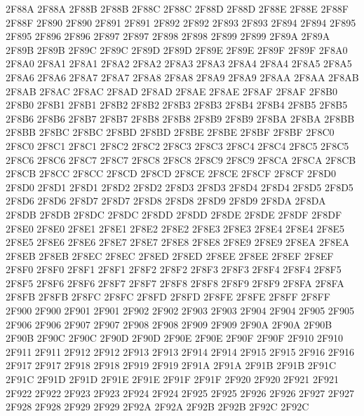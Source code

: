 \ID 2F88A 2F88A
\ID 2F88B 2F88B
\ID 2F88C 2F88C
\ID 2F88D 2F88D
\ID 2F88E 2F88E
\ID 2F88F 2F88F
\ID 2F890 2F890
\ID 2F891 2F891
\ID 2F892 2F892
\ID 2F893 2F893
\ID 2F894 2F894
\ID 2F895 2F895
\ID 2F896 2F896
\ID 2F897 2F897
\ID 2F898 2F898
\ID 2F899 2F899
\ID 2F89A 2F89A
\ID 2F89B 2F89B
\ID 2F89C 2F89C
\ID 2F89D 2F89D
\ID 2F89E 2F89E
\ID 2F89F 2F89F
\ID 2F8A0 2F8A0
\ID 2F8A1 2F8A1
\ID 2F8A2 2F8A2
\ID 2F8A3 2F8A3
\ID 2F8A4 2F8A4
\ID 2F8A5 2F8A5
\ID 2F8A6 2F8A6
\ID 2F8A7 2F8A7
\ID 2F8A8 2F8A8
\ID 2F8A9 2F8A9
\ID 2F8AA 2F8AA
\ID 2F8AB 2F8AB
\ID 2F8AC 2F8AC
\ID 2F8AD 2F8AD
\ID 2F8AE 2F8AE
\ID 2F8AF 2F8AF
\ID 2F8B0 2F8B0
\ID 2F8B1 2F8B1
\ID 2F8B2 2F8B2
\ID 2F8B3 2F8B3
\ID 2F8B4 2F8B4
\ID 2F8B5 2F8B5
\ID 2F8B6 2F8B6
\ID 2F8B7 2F8B7
\ID 2F8B8 2F8B8
\ID 2F8B9 2F8B9
\ID 2F8BA 2F8BA
\ID 2F8BB 2F8BB
\ID 2F8BC 2F8BC
\ID 2F8BD 2F8BD
\ID 2F8BE 2F8BE
\ID 2F8BF 2F8BF
\ID 2F8C0 2F8C0
\ID 2F8C1 2F8C1
\ID 2F8C2 2F8C2
\ID 2F8C3 2F8C3
\ID 2F8C4 2F8C4
\ID 2F8C5 2F8C5
\ID 2F8C6 2F8C6
\ID 2F8C7 2F8C7
\ID 2F8C8 2F8C8
\ID 2F8C9 2F8C9
\ID 2F8CA 2F8CA
\ID 2F8CB 2F8CB
\ID 2F8CC 2F8CC
\ID 2F8CD 2F8CD
\ID 2F8CE 2F8CE
\ID 2F8CF 2F8CF
\ID 2F8D0 2F8D0
\ID 2F8D1 2F8D1
\ID 2F8D2 2F8D2
\ID 2F8D3 2F8D3
\ID 2F8D4 2F8D4
\ID 2F8D5 2F8D5
\ID 2F8D6 2F8D6
\ID 2F8D7 2F8D7
\ID 2F8D8 2F8D8
\ID 2F8D9 2F8D9
\ID 2F8DA 2F8DA
\ID 2F8DB 2F8DB
\ID 2F8DC 2F8DC
\ID 2F8DD 2F8DD
\ID 2F8DE 2F8DE
\ID 2F8DF 2F8DF
\ID 2F8E0 2F8E0
\ID 2F8E1 2F8E1
\ID 2F8E2 2F8E2
\ID 2F8E3 2F8E3
\ID 2F8E4 2F8E4
\ID 2F8E5 2F8E5
\ID 2F8E6 2F8E6
\ID 2F8E7 2F8E7
\ID 2F8E8 2F8E8
\ID 2F8E9 2F8E9
\ID 2F8EA 2F8EA
\ID 2F8EB 2F8EB
\ID 2F8EC 2F8EC
\ID 2F8ED 2F8ED
\ID 2F8EE 2F8EE
\ID 2F8EF 2F8EF
\ID 2F8F0 2F8F0
\ID 2F8F1 2F8F1
\ID 2F8F2 2F8F2
\ID 2F8F3 2F8F3
\ID 2F8F4 2F8F4
\ID 2F8F5 2F8F5
\ID 2F8F6 2F8F6
\ID 2F8F7 2F8F7
\ID 2F8F8 2F8F8
\ID 2F8F9 2F8F9
\ID 2F8FA 2F8FA
\ID 2F8FB 2F8FB
\ID 2F8FC 2F8FC
\ID 2F8FD 2F8FD
\ID 2F8FE 2F8FE
\ID 2F8FF 2F8FF
\ID 2F900 2F900
\ID 2F901 2F901
\ID 2F902 2F902
\ID 2F903 2F903
\ID 2F904 2F904
\ID 2F905 2F905
\ID 2F906 2F906
\ID 2F907 2F907
\ID 2F908 2F908
\ID 2F909 2F909
\ID 2F90A 2F90A
\ID 2F90B 2F90B
\ID 2F90C 2F90C
\ID 2F90D 2F90D
\ID 2F90E 2F90E
\ID 2F90F 2F90F
\ID 2F910 2F910
\ID 2F911 2F911
\ID 2F912 2F912
\ID 2F913 2F913
\ID 2F914 2F914
\ID 2F915 2F915
\ID 2F916 2F916
\ID 2F917 2F917
\ID 2F918 2F918
\ID 2F919 2F919
\ID 2F91A 2F91A
\ID 2F91B 2F91B
\ID 2F91C 2F91C
\ID 2F91D 2F91D
\ID 2F91E 2F91E
\ID 2F91F 2F91F
\ID 2F920 2F920
\ID 2F921 2F921
\ID 2F922 2F922
\ID 2F923 2F923
\ID 2F924 2F924
\ID 2F925 2F925
\ID 2F926 2F926
\ID 2F927 2F927
\ID 2F928 2F928
\ID 2F929 2F929
\ID 2F92A 2F92A
\ID 2F92B 2F92B
\ID 2F92C 2F92C
